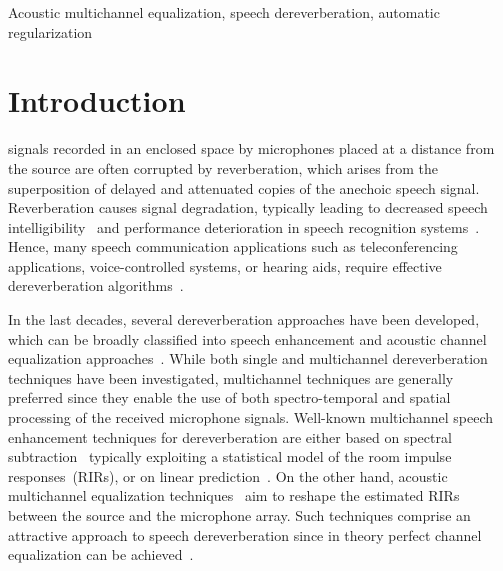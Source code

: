 \documentclass[10pt]{IEEEtran}
\begin{document}
\begin{IEEEkeywords}
Acoustic multichannel equalization, speech dereverberation, automatic regularization
\end{IEEEkeywords}


\section{Introduction}
 signals recorded in an enclosed space by microphones placed at a distance from the source are often corrupted by reverberation, which arises from the superposition of delayed and attenuated copies of the anechoic speech signal.
Reverberation causes signal degradation, typically leading to decreased speech intelligibility~\cite{Houtgast_1985,Beutelmann_2006} and performance deterioration in speech recognition systems~\cite{Omologo_1998, Sehr_phd, Maas_ICASSP_2012}.
Hence, many speech communication applications such as teleconferencing applications, voice-controlled systems, or hearing aids, require effective dereverberation algorithms~\cite{Sehr_phd,Jeub_ITASP_2010,Maas_ICASSP_2012}.

In the last decades, several dereverberation approaches have been developed, which can be broadly classified into speech enhancement and acoustic channel equalization approaches~\cite{Naylor_Derev_book}.
While both single and multichannel dereverberation techniques have been investigated, multichannel techniques are generally preferred since they enable the use of both spectro-temporal and spatial processing of the received microphone signals.
Well-known multichannel speech enhancement techniques for dereverberation are either based on spectral subtraction~\cite{Habets_ITASLP_2008,Habets_ICASSP_2007} typically exploiting a statistical model of the room impulse responses~(RIRs), or on linear prediction~\cite{Gaubitch_JASA_2006,Delcroix_2007,Nakatani_ITASLP_2010}.
On the other hand, acoustic multichannel equalization techniques~\cite{Miyoshi_ITASS_1988,Kallinger_ICASSP_2006, Hikichi_EURASIP_2007, Mertins_ITASLP_2010, Zhang_IWAENC_2010, Haque_ITASLP_2011, Kodrasi_ICASSP_2012} aim to reshape the estimated RIRs between the source and the microphone array.
Such techniques comprise an attractive approach to speech dereverberation since in theory perfect channel equalization can be achieved~\cite{Miyoshi_ITASS_1988, Hacihabibouglu_ITASLP_2012}.
\end{document}
